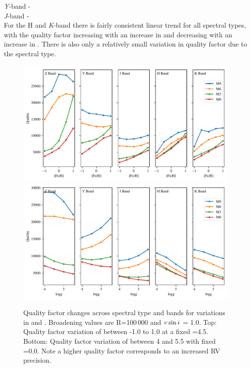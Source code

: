 \emph{Y}-band -\\

\emph{J}-band - \\

For the H and \emph{K}-band there is fairly consistent linear trend for all spectral types, with the quality factor increasing with an increase in \feh{} and decreasing with an increase in \logg{}.
There is also only a relatively small variation in quality factor due to the spectral type.



\begin{figure}
\includegraphics[width=0.99\linewidth]{figures/information-content/metalicity_effect.pdf}\\
\includegraphics[width=0.99\linewidth]{figures/information-content/logg_effect.pdf}
\caption{Quality factor changes across spectral type and bands for variations in \feh{} and \logg{}.
Broadening values are R=100\,000 and \(v\sin{i}\) = 1.0\kmps{}.
Top: Quality factor variation of \feh{} between -1.0 to 1.0 at a fixed \logg{}=4.5.
Bottom: Quality factor variation of \logg{} between 4 and 5.5 with fixed \feh{}=0.0.
Note a higher quality factor corresponds to an increased {RV} precision.}
\label{fig:deviations}
\end{figure}


